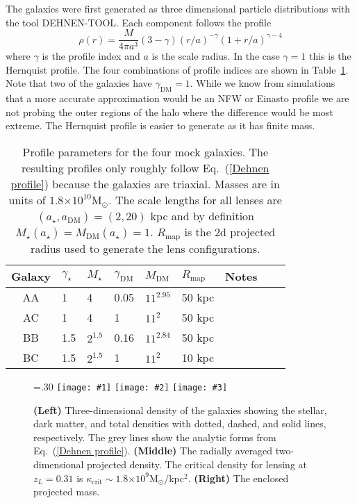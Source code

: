 \documentclass[galley,usenatbib]{mn2e}
\newcommand{\Rmap}{\ensuremath{R_\mathrm{map}}}
\newcommand{\Msun}{\ensuremath{\mathrm{M}_\odot}}
\newcommand{\tabref}[1] {Table~\ref{#1}}
\newcommand{\eqnref}[1] {Eq.~(\ref{#1})}
\newcommand{\e}[1]{\ensuremath{\times 10^{#1}}}
\newcommand\plotone[1]{%
 \centering
 \leavevmode
 \texttt{[image: \#1]}%
}%
\newcommand\plotthree[3]{{%
 \centering
 \leavevmode
 \columnwidth=.30\columnwidth
 \texttt{[image: \#1]}%
 \hfil
 \texttt{[image: \#2]}%
 \hfil
 \texttt{[image: \#3]}%
}}%
\begin{document}
The galaxies were
first generated as three dimensional particle distributions with the
tool DEHNEN-TOOL. Each component follows the profile
\begin{equation}
\rho(r) = \frac{M}{4\pi a^3}(3-\gamma){(r/a)^{-\gamma}(1 + r/a)^{\gamma-4}}
\label{Dehnen profile}
\end{equation}
where $\gamma$ is the profile index and $a$ is the scale radius.  In the
case $\gamma=1$ this is the Hernquist profile.  The four combinations of
profile indices are shown in \tabref{mock galaxy params}.  Note that two of
the galaxies have $\gamma_\mathrm{DM}=1$. While we know from simulations that a
more accurate approximation would be an NFW or Einasto profile we are not
probing the outer regions of the halo where the difference would be most
extreme.  The Hernquist profile is easier to generate as it has finite mass.

\begin{table}
\begin{tabular}{cllllllll}
Galaxy & $\gamma_\star$ & $M_\star$ & $\gamma_\mathrm{DM}$ & $M_\mathrm{DM}$ & $\Rmap$ & Notes\\
\hline
AA & 1 & 4 & 0.05 & $11^{2.95}$ & 50 kpc & \\
AC & 1 & 4 & 1 & $11^2$ & 50 kpc & \\
BB & 1.5 & $2^{1.5}$ & 0.16 & $11^{2.84}$ & 50 kpc & \\
BC & 1.5 & $2^{1.5}$ & 1 & $11^2$ & 10 kpc & 
\end{tabular}
\caption{Profile parameters for the four mock galaxies. The resulting profiles only roughly follow
\eqnref{Dehnen profile} because the galaxies are triaxial. Masses are in units of $1.8\e{10}\Msun$. The scale lengths for
all lenses are $(a_\star,a_\mathrm{DM})=(2,20)$ kpc and by definition
$M_\star(a_\star) = M_\mathrm{DM}(a_\star) = 1$. $\Rmap$ is the 2d projected radius used to generate the lens configurations.}
\label{mock galaxy params}
\end{table}

\begin{figure}
\plotthree{MockGalProfile-a.pdf} {MockGalProfile-b.pdf} {MockGalProfile-c.pdf}
\caption{
\textbf{(Left)} 
Three-dimensional density of the galaxies showing the stellar, dark matter,
and total densities with dotted, dashed, and solid lines, respectively. The
grey lines show the analytic forms from \eqnref{Dehnen profile}. 
\textbf{(Middle)} 
The radially averaged two-dimensional projected density.
The critical density for lensing at $z_L=0.31$ is $\kappa_\mathrm{crit}\sim 1.8\e{9}$\Msun/kpc$^2$.
\textbf{(Right)}
The enclosed projected mass.
}
\label{mock galaxies}
\end{figure}
\end{document}
